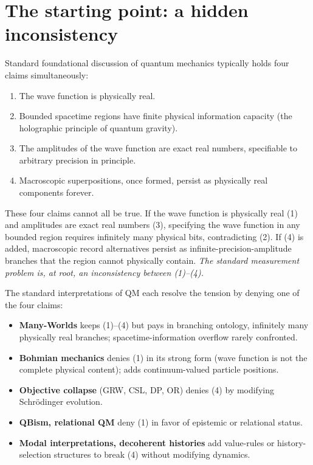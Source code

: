 \documentclass[11pt,a4paper]{article}
\begin{document}
\section{The starting point: a hidden inconsistency}

Standard foundational discussion of quantum mechanics typically holds four claims simultaneously:

\begin{enumerate}
  \item The wave function is physically real.
  \item Bounded spacetime regions have finite physical information capacity (the holographic principle of quantum gravity).
  \item The amplitudes of the wave function are exact real numbers, specifiable to arbitrary precision in principle.
  \item Macroscopic superpositions, once formed, persist as physically real components forever.
\end{enumerate}

These four claims cannot all be true. If the wave function is physically real (1) and amplitudes are exact real numbers (3), specifying the wave function in any bounded region requires infinitely many physical bits, contradicting (2). If (4) is added, macroscopic record alternatives persist as infinite-precision-amplitude branches that the region cannot physically contain. \emph{The standard measurement problem is, at root, an inconsistency between (1)–(4).}

The standard interpretations of QM each resolve the tension by denying one of the four claims:

\begin{itemize}
  \item \textbf{Many-Worlds} keeps (1)–(4) but pays in branching ontology, infinitely many physically real branches; spacetime-information overflow rarely confronted.
  \item \textbf{Bohmian mechanics} denies (1) in its strong form (wave function is not the complete physical content); adds continuum-valued particle positions.
  \item \textbf{Objective collapse} (GRW, CSL, DP, OR) denies (4) by modifying Schrödinger evolution.
  \item \textbf{QBism, relational QM} deny (1) in favor of epistemic or relational status.
  \item \textbf{Modal interpretations, decoherent histories} add value-rules or history-selection structures to break (4) without modifying dynamics.
\end{itemize}
\end{document}
